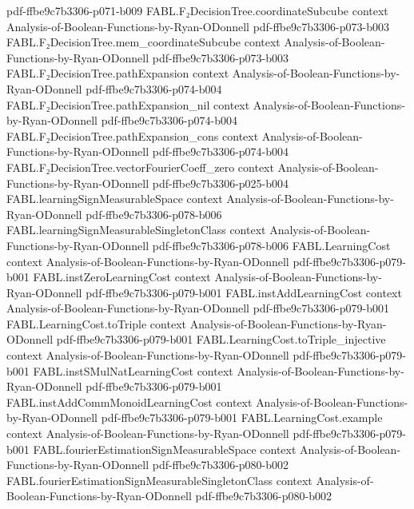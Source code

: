 \begin{theorem}
  {pdf-ffbe9c7b3306-p071-b009}
\proofstep
  {FABL.F₂DecisionTree.coordinateSubcube}
  {context}
  {Analysis-of-Boolean-Functions-by-Ryan-ODonnell}
  {pdf-ffbe9c7b3306-p073-b003}
\proofstep
  {FABL.F₂DecisionTree.mem_coordinateSubcube}
  {context}
  {Analysis-of-Boolean-Functions-by-Ryan-ODonnell}
  {pdf-ffbe9c7b3306-p073-b003}
\proofstep
  {FABL.F₂DecisionTree.pathExpansion}
  {context}
  {Analysis-of-Boolean-Functions-by-Ryan-ODonnell}
  {pdf-ffbe9c7b3306-p074-b004}
\proofstep
  {FABL.F₂DecisionTree.pathExpansion_nil}
  {context}
  {Analysis-of-Boolean-Functions-by-Ryan-ODonnell}
  {pdf-ffbe9c7b3306-p074-b004}
\proofstep
  {FABL.F₂DecisionTree.pathExpansion_cons}
  {context}
  {Analysis-of-Boolean-Functions-by-Ryan-ODonnell}
  {pdf-ffbe9c7b3306-p074-b004}
\proofstep
  {FABL.F₂DecisionTree.vectorFourierCoeff_zero}
  {context}
  {Analysis-of-Boolean-Functions-by-Ryan-ODonnell}
  {pdf-ffbe9c7b3306-p025-b004}
\proofstep
  {FABL.learningSignMeasurableSpace}
  {context}
  {Analysis-of-Boolean-Functions-by-Ryan-ODonnell}
  {pdf-ffbe9c7b3306-p078-b006}
\proofstep
  {FABL.learningSignMeasurableSingletonClass}
  {context}
  {Analysis-of-Boolean-Functions-by-Ryan-ODonnell}
  {pdf-ffbe9c7b3306-p078-b006}
\proofstep
  {FABL.LearningCost}
  {context}
  {Analysis-of-Boolean-Functions-by-Ryan-ODonnell}
  {pdf-ffbe9c7b3306-p079-b001}
\proofstep
  {FABL.instZeroLearningCost}
  {context}
  {Analysis-of-Boolean-Functions-by-Ryan-ODonnell}
  {pdf-ffbe9c7b3306-p079-b001}
\proofstep
  {FABL.instAddLearningCost}
  {context}
  {Analysis-of-Boolean-Functions-by-Ryan-ODonnell}
  {pdf-ffbe9c7b3306-p079-b001}
\proofstep
  {FABL.LearningCost.toTriple}
  {context}
  {Analysis-of-Boolean-Functions-by-Ryan-ODonnell}
  {pdf-ffbe9c7b3306-p079-b001}
\proofstep
  {FABL.LearningCost.toTriple_injective}
  {context}
  {Analysis-of-Boolean-Functions-by-Ryan-ODonnell}
  {pdf-ffbe9c7b3306-p079-b001}
\proofstep
  {FABL.instSMulNatLearningCost}
  {context}
  {Analysis-of-Boolean-Functions-by-Ryan-ODonnell}
  {pdf-ffbe9c7b3306-p079-b001}
\proofstep
  {FABL.instAddCommMonoidLearningCost}
  {context}
  {Analysis-of-Boolean-Functions-by-Ryan-ODonnell}
  {pdf-ffbe9c7b3306-p079-b001}
\proofstep
  {FABL.LearningCost.example}
  {context}
  {Analysis-of-Boolean-Functions-by-Ryan-ODonnell}
  {pdf-ffbe9c7b3306-p079-b001}
\proofstep
  {FABL.fourierEstimationSignMeasurableSpace}
  {context}
  {Analysis-of-Boolean-Functions-by-Ryan-ODonnell}
  {pdf-ffbe9c7b3306-p080-b002}
\proofstep
  {FABL.fourierEstimationSignMeasurableSingletonClass}
  {context}
  {Analysis-of-Boolean-Functions-by-Ryan-ODonnell}
  {pdf-ffbe9c7b3306-p080-b002}

\end{theorem}
